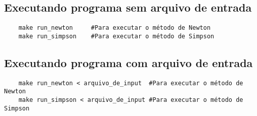 \subsection{Executando programa sem arquivo de entrada}
\begin{verbatim}
	make run_newton		#Para executar o método de Newton
	make run_simpson	#Para executar o método de Simpson
\end{verbatim}

\subsection{Executando programa com arquivo de entrada}
\begin{verbatim}
	make run_newton	< arquivo_de_input	#Para executar o método de Newton
	make run_simpson < arquivo_de_input	#Para executar o método de Simpson
\end{verbatim}

